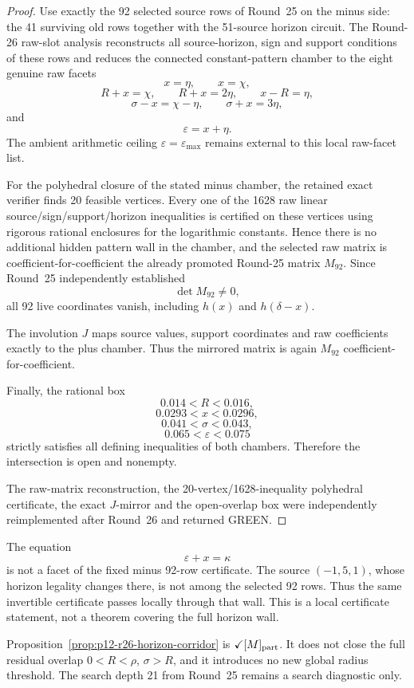 \begin{proof}
Use exactly the 92 selected source rows of Round~25 on the minus side: the
41 surviving old rows together with the 51-source horizon circuit. The
Round-26 raw-slot analysis reconstructs all source-horizon, sign and support
conditions of these rows and reduces the connected constant-pattern chamber
to the eight genuine raw facets
\[
x=\eta,\qquad x=\chi,
\]
\[
R+x=\chi,\qquad R+x=2\eta,\qquad x-R=\eta,
\]
\[
\sigma-x=\chi-\eta,\qquad \sigma+x=3\eta,
\]
and
\[
\varepsilon=x+\eta.
\]
The ambient arithmetic ceiling \(\varepsilon=\varepsilon_{\max}\) remains
external to this local raw-facet list.

For the polyhedral closure of the stated minus chamber, the retained exact
verifier finds 20 feasible vertices. Every one of the 1628 raw linear
source/sign/support/horizon inequalities is certified on these vertices using
rigorous rational enclosures for the logarithmic constants. Hence there is no
additional hidden pattern wall in the chamber, and the selected raw matrix is
coefficient-for-coefficient the already promoted Round-25 matrix \(M_{92}\).
Since Round~25 independently established
\[
\det M_{92}\ne0,
\]
all 92 live coordinates vanish, including \(h(x)\) and
\(h(\delta-x)\).

The involution \(J\) maps source values, support coordinates and raw
coefficients exactly to the plus chamber. Thus the mirrored matrix is again
\(M_{92}\) coefficient-for-coefficient.

Finally, the rational box
\[
0.014<R<0.016,
\]
\[
0.0293<x<0.0296,
\]
\[
0.041<\sigma<0.043,
\]
\[
0.065<\varepsilon<0.075
\]
strictly satisfies all defining inequalities of both chambers. Therefore the
intersection is open and nonempty.

The raw-matrix reconstruction, the 20-vertex/1628-inequality polyhedral
certificate, the exact \(J\)-mirror and the open-overlap box were independently
reimplemented after Round~26 and returned GREEN.
\end{proof}

\begin{remark}
The equation
\[
\varepsilon+x=\kappa
\]
is not a facet of the fixed minus 92-row certificate. The source
\((-1,5,1)\), whose horizon legality changes there, is not among the selected
92 rows. Thus the same invertible certificate passes locally through that
wall. This is a local certificate statement, not a theorem covering the full
horizon wall.
\end{remark}

\begin{remark}[Scope]
Proposition~\ref{prop:p12-r26-horizon-corridor} is
\(\checkmark[M]_{\rm part}\). It does not close the full residual overlap
\(0<R<\rho\), \(\sigma>R\), and it introduces no new global radius threshold.
The search depth 21 from Round~25 remains a search diagnostic only.
\end{remark}
